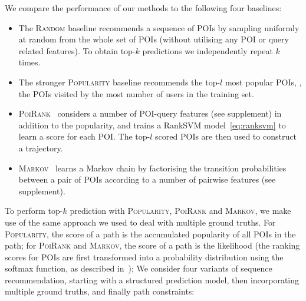 We compare the performance of our methods to the following four baselines:
\begin{itemize}[leftmargin=0.125in]\itemmoveup
\parskip -.05em
\item The \textsc{Random} baseline recommends a sequence of POIs by sampling uniformly at random from the whole set of POIs
      (without utilising any POI or query related features). 
      To obtain top-$k$ predictions we independently repeat $k$ times.

\item The stronger \textsc{Popularity} baseline recommends the top-$l$ most popular POIs,
      \ie, the POIs visited by the most number of users in the training set.

\item \textsc{PoiRank}~\cite{cikm16paper}
      considers a number of POI-query features (see supplement) in addition to the popularity,
      and trains a RankSVM model~\eqref{eq:ranksvm} to learn a score for each POI. The top-$l$ scored POIs are then used to construct a trajectory.

\item \textsc{Markov}~\cite{cikm16paper} learns a Markov chain by factorising the transition probabilities between a pair of POIs 
      according to a number of pairwise features (see supplement). 

\end{itemize}\itemmoveup
To perform top-$k$ prediction with \textsc{Popularity}, \textsc{PoiRank} and \textsc{Markov},
we make use of the same approach we used to deal with multiple ground truths.
For \textsc{Popularity}, the score of a path is the accumulated popularity of all POIs in the path;
for \textsc{PoiRank} and \textsc{Markov}, the score of a path is the likelihood
(the ranking scores for POIs are first transformed into a probability distribution using the softmax function, as described in~\cite{cikm16paper});
We consider four variants of sequence recommendation, starting with a structured prediction model, then incorporating multiple ground truths, and finally path constraints:
